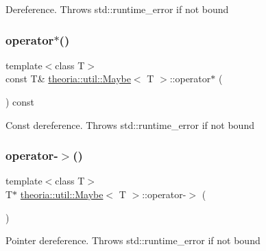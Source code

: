 Dereference. Throws std\+::runtime\+\_\+error if not bound \mbox{\label{classtheoria_1_1util_1_1Maybe_a9000a809c918d529a2462e1d53ac138d}} 
\subsubsection{\texorpdfstring{operator$\ast$()}{operator*()}\hspace{0.1cm}{\footnotesize\ttfamily [2/2]}}
{\footnotesize\ttfamily template$<$class T$>$ \\
const T\& \hyperlink{classtheoria_1_1util_1_1Maybe}{theoria\+::util\+::\+Maybe}$<$ T $>$\+::operator$\ast$ (\begin{DoxyParamCaption}{ }\end{DoxyParamCaption}) const\hspace{0.3cm}{\ttfamily [inline]}}

Const dereference. Throws std\+::runtime\+\_\+error if not bound \mbox{\label{classtheoria_1_1util_1_1Maybe_ae85df3b0214529075af8010ed943ae83}} 
\subsubsection{\texorpdfstring{operator-\/$>$()}{operator->()}\hspace{0.1cm}{\footnotesize\ttfamily [1/2]}}
{\footnotesize\ttfamily template$<$class T$>$ \\
T$\ast$ \hyperlink{classtheoria_1_1util_1_1Maybe}{theoria\+::util\+::\+Maybe}$<$ T $>$\+::operator-\/$>$ (\begin{DoxyParamCaption}{ }\end{DoxyParamCaption})\hspace{0.3cm}{\ttfamily [inline]}}

Pointer dereference. Throws std\+::runtime\+\_\+error if not bound \mbox{\label{classtheoria_1_1util_1_1Maybe_a064989af954077e2817c1c4c0bf8d87f}} 
